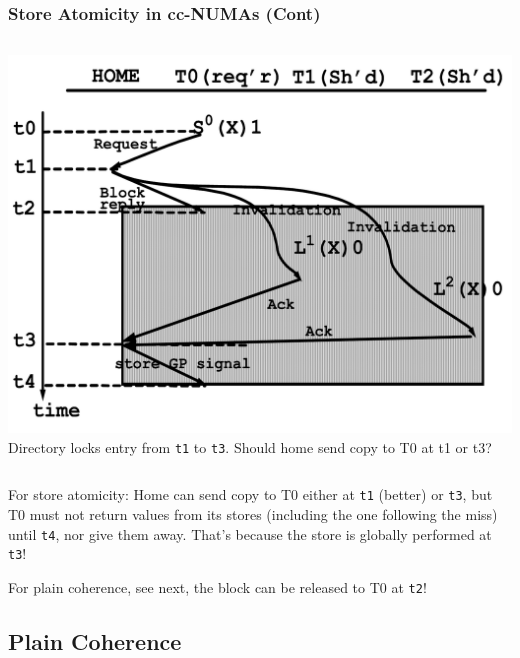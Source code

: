 \documentclass{beamer}
\renewcommand{\emph}[1]{\textcolor{structure}{#1}}
\newcommand{\emp}[1]{\textcolor{DikuRed}{ #1}}
\begin{document}
\begin{frame}[fragile,t]
\frametitle{Store Atomicity in cc-NUMAs (Cont)}

\begin{columns}
\includegraphics[width=44ex]{Ch7Figs/StoreAtomccNUMA}\pause
{}
Directory locks entry from {\tt t1} to {\tt t3}.
\alert{Should home send copy to T0 at t1 or t3?}
\end{columns}
\pause

\emph{For store atomicity:} Home can send copy to T0 either at {\tt t1} (better)
or {\tt t3}, but T0 must not return values from its stores (including the
one following the miss) until {\tt t4}, nor give them away.
That's because the store is globally performed at {\tt t3}!
\medskip

\emp{For plain coherence}, see next, the block can be released to T0 at {\tt t2}!

\end{frame}

\subsection{Plain Coherence}
\end{document}
